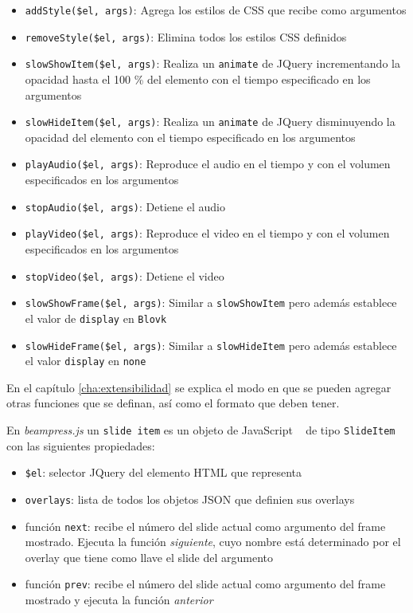 			\begin{itemize}
				\item \texttt{addStyle(\$el, args)}: Agrega los estilos de CSS que recibe como argumentos
				\item \texttt{removeStyle(\$el, args)}: Elimina todos los estilos CSS definidos
				\item \texttt{slowShowItem(\$el, args)}: Realiza un \texttt{animate} de JQuery incrementando la opacidad hasta el 100 \% del elemento con el tiempo especificado en los argumentos
				\item \texttt{slowHideItem(\$el, args)}: Realiza un \texttt{animate} de JQuery disminuyendo la opacidad del elemento con el tiempo especificado en los argumentos
				\item \texttt{playAudio(\$el, args)}: Reproduce el audio en el tiempo y con el volumen especificados en los argumentos
				\item \texttt{stopAudio(\$el, args)}: Detiene el audio
				\item \texttt{playVideo(\$el, args)}: Reproduce el video en el tiempo y con el volumen especificados en los argumentos
				\item \texttt{stopVideo(\$el, args)}: Detiene el video
				\item \texttt{slowShowFrame(\$el, args)}: Similar a \texttt{slowShowItem} pero además establece el valor de \texttt{display} en \texttt{Blovk}
				\item \texttt{slowHideFrame(\$el, args)}: Similar a \texttt{slowHideItem} pero además establece el valor \texttt{display} en \texttt{none}				
			\end{itemize}
			En el capítulo \ref{cha:extensibilidad} se explica el modo en que se pueden agregar otras funciones que se definan, así como el formato que deben tener.

			En \textit{beampress.js} un \texttt{slide item} es un objeto de JavaScript ~\cite{book:1047044} de tipo \texttt{SlideItem} con las siguientes propiedades:

			\begin{itemize}
			\label{it:slide_item}
			 	\item \texttt{\$el}: selector JQuery del elemento HTML que representa
			 	\item \texttt{overlays}: lista de todos los objetos JSON que definien sus overlays
			 	\item función \texttt{next}: recibe el número del slide actual como argumento del frame mostrado. Ejecuta la función \textit{siguiente}, cuyo nombre está determinado por el overlay que tiene como llave el slide del argumento 
			 	\item función \texttt{prev}: recibe el número del slide actual como argumento del frame mostrado y ejecuta la función \textit{anterior}			 	
			 \end{itemize} 
				
